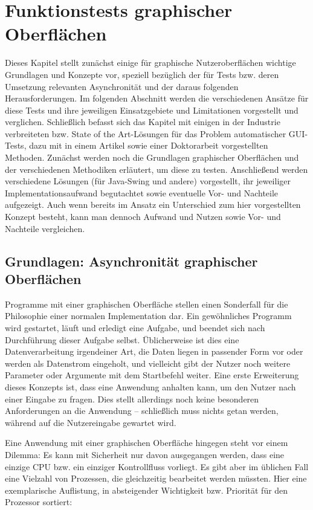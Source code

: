 \chapter{Funktionstests graphischer Oberflächen}\label{chapter:introguitesting}


Dieses Kapitel stellt zunächst einige für graphische Nutzeroberflächen wichtige 
Grundlagen und Konzepte vor, speziell bezüglich der für Tests bzw. deren Umsetzung
relevanten Asynchronität und der daraus folgenden Herausforderungen.
Im folgenden Abschnitt werden die verschiedenen Ansätze für diese Tests
und ihre jeweiligen Einsatzgebiete und Limitationen vorgestellt und verglichen.
Schließlich befasst sich das Kapitel mit einigen in der Industrie 
verbreiteten bzw. \glqq{}State of the Art\grqq{}-Lösungen
für das Problem automatischer GUI-Tests, dazu mit in einem Artikel sowie einer Doktorarbeit
vorgestellten Methoden. Zunächst werden noch die Grundlagen graphischer Oberflächen und
der verschiedenen Methodiken erläutert, um diese zu testen.
Anschließend werden verschiedene Lösungen (für Java-Swing und andere) vorgestellt,
ihr jeweiliger Implementationsaufwand begutachtet sowie eventuelle Vor- und Nachteile aufgezeigt.
Auch wenn bereits im Ansatz ein Unterschied zum hier vorgestellten Konzept besteht, kann man dennoch
Aufwand und Nutzen sowie Vor- und Nachteile vergleichen.



\section{Grundlagen: Asynchronität graphischer Oberflächen}


Programme mit einer graphischen Oberfläche stellen einen Sonderfall für
die Philosophie einer normalen Implementation dar. Ein gewöhnliches Programm wird
gestartet, läuft und erledigt eine Aufgabe, und beendet sich nach
Durchführung dieser Aufgabe selbst. Üblicherweise ist dies eine Datenverarbeitung
irgendeiner Art, die Daten liegen in passender Form vor oder werden 
als Datenstrom eingeholt, und vielleicht gibt der Nutzer noch weitere Parameter
oder Argumente mit dem Startbefehl weiter. Eine erste Erweiterung dieses
Konzepts ist, dass eine Anwendung anhalten kann, um den Nutzer nach einer
Eingabe zu fragen. Dies stellt allerdings noch keine besonderen Anforderungen
an die Anwendung -- schließlich muss nichts getan werden, während auf
die Nutzereingabe gewartet wird.

Eine Anwendung mit einer graphischen Oberfläche hingegen steht vor
einem Dilemma: Es kann mit Sicherheit nur davon ausgegangen werden, dass eine
einzige CPU bzw. ein einziger Kontrollfluss vorliegt. Es gibt aber im üblichen Fall
eine Vielzahl von Prozessen, die gleichzeitig bearbeitet werden müssten. Hier eine exemplarische
Auflistung, in absteigender Wichtigkeit bzw. Priorität für den Prozessor
sortiert:

